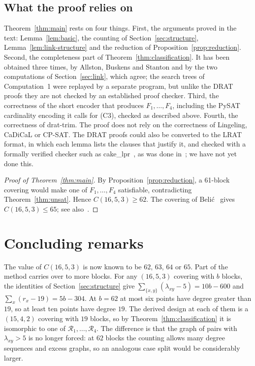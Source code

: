\documentclass[11pt]{amsart}
\theoremstyle{definition}
\theoremstyle{remark}
\newcommand{\cR}{\mathcal{R}}
\begin{document}
\subsection*{What the proof relies on}
Theorem~\ref{thm:main} rests on four things. First, the arguments proved in
the text: Lemma~\ref{lem:basic}, the counting of Section~\ref{sec:structure},
Lemma~\ref{lem:link-structure} and the reduction of
Proposition~\ref{prop:reduction}. Second, the completeness part of
Theorem~\ref{thm:classification}. It has been obtained three times, by
Allston, Buskens and Stanton and by the two computations of
Section~\ref{sec:link}, which agree; the search trees of Computation~1 were
replayed by a separate program, but unlike the DRAT proofs they are not
checked by an established proof checker. Third, the correctness of the short
encoder that produces $F_1,\dots,F_4$, including the PySAT cardinality
encoding it calls for (C3), checked as described above. Fourth, the
correctness of drat-trim. The proof does not rely on the correctness of
Lingeling, CaDiCaL or CP-SAT. The DRAT proofs could also be converted to the
LRAT format, in which each lemma lists the clauses that justify it, and
checked with a formally verified checker such as
cake\_lpr~\cite{tan2021cakelpr}, as was done in~\cite{krug2026}; we have not
yet done this.

\begin{proof}[Proof of Theorem~\ref{thm:main}]
By Proposition~\ref{prop:reduction}, a 61-block covering would make one of
$F_1,\dots,F_4$ satisfiable, contradicting Theorem~\ref{thm:unsat}. Hence
$C(16,5,3)\ge 62$. The covering of Beli\'c~\cite{ljcr} gives
$C(16,5,3)\le 65$; see also~\cite[Corollary~2.3.18]{bluskov1997}.
\end{proof}

\section{Concluding remarks}\label{sec:remarks}

The value of $C(16,5,3)$ is now known to be $62$, $63$, $64$ or $65$. Part of
the method carries over to more blocks. For any $(16,5,3)$ covering with $b$
blocks, the identities of Section~\ref{sec:structure} give
$\sum_{\{x,y\}}(\lambda_{xy}-5)=10b-600$ and $\sum_x(r_x-19)=5b-304$. At
$b=62$ at most six points have degree greater than $19$, so at least ten
points have degree $19$. The derived design at each of them is a $(15,4,2)$
covering with $19$ blocks, so by Theorem~\ref{thm:classification} it is
isomorphic to one of $\cR_1,\dots,\cR_4$. The difference is that the graph of
pairs with $\lambda_{xy}>5$ is no longer forced: at $62$ blocks the counting
allows many degree sequences and excess graphs, so an analogous case split
would be considerably larger.
\end{document}
